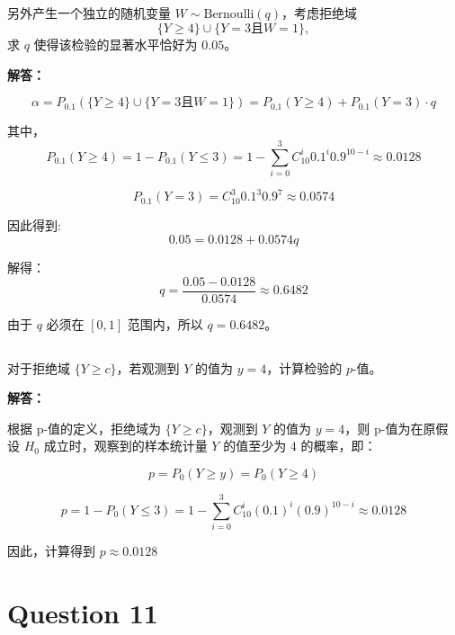 \documentclass[12pt,a4paper]{article}
\begin{document}
\subsection{}

另外产生一个独立的随机变量 $W \sim \text{Bernoulli}(q)$，考虑拒绝域
    \[
    \{Y \geq 4\} \cup \{Y = 3 \text{且} W = 1\},
\]
    求 $q$ 使得该检验的显著水平恰好为 $0.05$。

\begin{answerbox}
\textbf{解答：}

$$
\alpha = P_{0.1}\left(\{Y \geq 4\} \cup \{Y = 3 \text{且} W = 1\}\right) = P_{0.1}\left(Y \geq 4\right) + P_{0.1}\left(Y = 3\right) \cdot q
$$

其中，
$$
P_{0.1}\left(Y \geq 4\right) = 1 - P_{0.1}\left(Y\leq 3\right) = 1 - \sum_{i = 0}^{3}C_{10}^{i} 0.1^i 0.9^{10-i} \approx 0.0128
$$

$$
P_{0.1}\left(Y = 3\right) = C_{10}^{3} 0.1^3 0.9^7 \approx 0.0574
$$

因此得到:
$$
0.05 = 0.0128 + 0.0574q
$$

解得：
$$
q = \frac{0.05 - 0.0128}{0.0574} \approx 0.6482
$$

由于 $q$ 必须在 $[0,1]$ 范围内，所以 $q = 0.6482$。

\end{answerbox}


\subsection{}

    对于拒绝域 $\{Y \geq c\}$，若观测到 $Y$ 的值为 $y=4$，计算检验的 $p$-值。

\begin{answerbox}
\textbf{解答：}

根据 p-值的定义，拒绝域为 $\{Y \geq c\}$，观测到 $Y$ 的值为 $y=4$，则 p-值为在原假设 $H_0$ 成立时，观察到的样本统计量 $Y$ 的值至少为 $4$ 的概率，即：

$$
p = P_0\left(Y \geq y\right) = P_0\left(Y \geq 4\right)
$$

$$
p = 1 - P_0\left(Y \leq 3\right) = 1 - \sum_{i=0}^{3} C_{10}^{i} (0.1)^i (0.9)^{10-i} \approx 0.0128
$$

因此，计算得到 $p\approx 0.0128$

\end{answerbox}

\section{Question 11}
\end{document}
